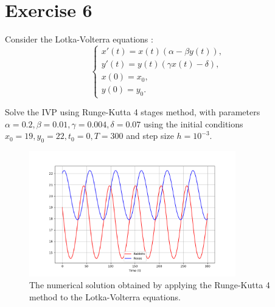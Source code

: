 \documentclass[a4paper,12pt]{article}
\begin{document}
\section{Exercise 6}

Consider the Lotka-Volterra equations :
\begin{equation}
\begin{cases}
x'(t) = x(t)( \alpha - \beta y(t)) , \\
y'(t) = y(t)(\gamma x(t) - \delta) , \\
x(0) = x_0 , \\
y(0) = y_0 .
\end{cases}
\end{equation}

Solve the IVP using Runge-Kutta 4 stages method, with parameters $\alpha = 0.2 , \beta = 0.01 , \gamma = 0.004 , \delta = 0.07 $ using the initial conditions $x_0 = 19 , y_0 = 22 , t_0 = 0, T = 300$ and step size $h = 10^{-3}$.

\begin{figure}[H]
\centering
\includegraphics[width=0.8\textwidth]{lotka_volterra.png}
\caption{The numerical solution obtained by applying the Runge-Kutta 4 method to the Lotka-Volterra equations.}
\label{fig:lotka_volterra_solution}
\end{figure}


%
%
\end{document}
